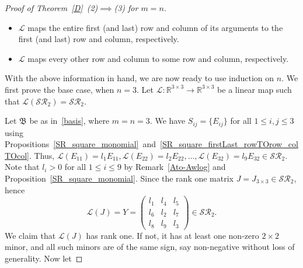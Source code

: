 \documentclass[11pt,reqno]{amsart}
\theoremstyle{plain}
\theoremstyle{definition}
\numberwithin{equation}{section}
\begin{document}
\begin{proof}[Proof of Theorem~\ref{D}~(2)$\implies$(3) for $m=n$]
\begin{itemize}
		\item[(iii)] $\mathcal{L}$ maps the entire first (and last) row and column of its arguments to the first (and last) row and column, respectively.
		
		\item[(iv)] $\mathcal{L}$ maps every other row and column to some row and column, respectively.
	\end{itemize} 
	With the above information in hand, we are now ready to use induction on $n$. We first prove the base case, when $n=3$. Let $\mathcal{L}:\mathbb{R}^{3\times3}\to\mathbb{R}^{3\times3}$ be a linear map such that $\mathcal{L}(\mathcal{SR}_2)=\mathcal{SR}_2$.
	
	Let $\mathfrak{B}$ be as in~\eqref{basis}, where $m=n=3$. We have $S_{ij}=\{E_{ij}\}$ for all $1\leq i,j\leq 3$ using Propositions~\ref{SR_square_monomial}~and~\ref{SR_square_firstLast_rowTOrow_colTOcol}. Thus, $\mathcal{L}(E_{11})=l_{1}E_{11},\mathcal{L}(E_{22})=l_{2}E_{22},\ldots,\mathcal{L}(E_{32})=l_{9}E_{32}\in \mathcal{SR}_2$. Note that $l_{i}>0$ for all $1\leq i\leq 9$ by Remark~\ref{Ato-Awlog} and Proposition~\ref{SR_square_monomial}. 
	Since the rank one matrix $J = J_{3 \times 3}
	\in \mathcal{SR}_2$, hence
	\[\mathcal{L}(J)=Y=\begin{pmatrix}
		l_{1} & l_{4} & l_{5} \\
		l_{6} & l_{2} & l_{7} \\
		l_{8} & l_{9} & l_{3} 
	\end{pmatrix}\in \mathcal{SR}_2.\]
	We claim that $\mathcal{L}(J)$ has rank one. If not, it has at least one non-zero $2\times2$ minor, and all such minors are of the same sign, say non-negative without loss of generality. Now let

\end{proof}
\end{document}
